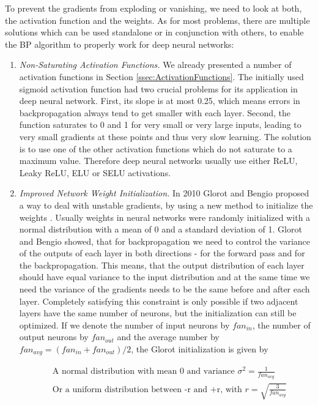 To prevent the gradients from exploding or vanishing, we need to look at both, the activation function and the weights. As for most problems, there are multiple solutions which can be used standalone or in conjunction with others, to enable the BP algorithm to properly work for deep neural networks:

\begin{enumerate}
  \item \textit{Non-Saturating Activation Functions.} We already presented a number of activation functions in Section \ref{ssec:ActivationFunctions}. The initially used sigmoid activation function had two crucial problems for its application in deep neural network. First, its slope is at most 0.25, which means errors in backpropagation always tend to get smaller with each layer. Second, the function saturates to 0 and 1 for very small or very large inputs, leading to very small gradients at these points and thus very slow learning. The solution is to use one of the other activation functions which do not saturate to a maximum value. Therefore deep neural networks usually use either ReLU, Leaky ReLU, ELU or SELU activations. 
  \item \textit{Improved Network Weight Initialization.} In 2010 Glorot and Bengio proposed a way to deal with unstable gradients, by using a new method to initialize the weights \cite{glorot2010understanding}. Usually weights in neural networks were randomly initialized with a normal distribution with a mean of 0 and a standard deviation of 1. Glorot and Bengio showed, that for backpropagation we need to control the variance of the outputs of each layer in both directions - for the forward pass and for the backpropagation. This means, that the output distribution of each layer should have equal variance to the input distribution and at the same time we need the variance of the gradients needs to be the same before and after each layer. Completely satisfying this constraint is only possible if two adjacent layers have the same number of neurons, but the initialization can still be optimized. If we denote the number of input neurons by $fan_{in}$, the number of output neurons by $fan_{out}$ and the average number by $fan_{avg} = (fan_{in} + fan_{out}) / 2$, the Glorot initialization is given by 

  \begin{align*}
    &\text{A normal distribution with mean 0 and variance } \sigma^2 = \frac{1}{fan_{avg}} \\
    &\text{Or a uniform distribution between -r and +r, with } r = \sqrt{\frac{3}{fan_{avg}}}
  \end{align*}
  

\end{enumerate}
